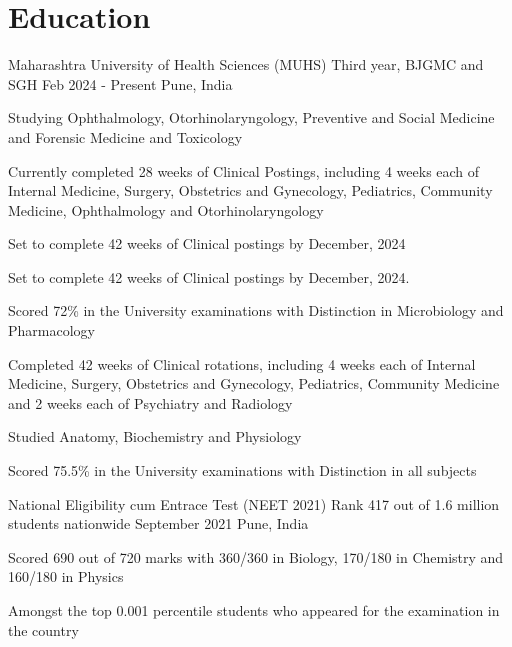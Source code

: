 \section{Education}
\resumeSubHeadingListStart

\resumeExp
{Maharashtra University of Health Sciences (MUHS)}
{Third year, BJGMC and SGH}
{Feb 2024 - Present}
{Pune, India}

\resumeItemListStart
\item[$\bullet$] Studying Ophthalmology, Otorhinolaryngology, Preventive and Social Medicine and Forensic Medicine and Toxicology
\item[$\bullet$] Currently completed 28 weeks of Clinical Postings, including 4 weeks each of Internal Medicine, Surgery, Obstetrics and Gynecology, Pediatrics, Community Medicine, Ophthalmology and Otorhinolaryngology
\item[$\bullet$] Set to complete 42 weeks of Clinical postings by December, 2024
\resumeItemListEnd


\resumeItemListStart
\item[$\bullet$] Set to complete 42 weeks of Clinical postings by December, 2024.
\item[$\bullet$] Scored 72\% in the University examinations with Distinction in Microbiology and Pharmacology
\item[$\bullet$] Completed 42 weeks of Clinical rotations, including 4 weeks each of Internal Medicine, Surgery, Obstetrics and Gynecology, Pediatrics, Community Medicine  and 2 weeks each of Psychiatry and Radiology
\resumeItemListEnd


\resumeItemListStart
\item[$\bullet$] Studied Anatomy, Biochemistry and Physiology
\item[$\bullet$] Scored 75.5\% in the University examinations with Distinction in all subjects
\resumeItemListEnd

\resumeExp
{National Eligibility cum Entrace Test (NEET 2021)}
{Rank 417 out of 1.6 million students nationwide}
{September 2021}
{Pune, India}

\resumeItemListStart
		\item[$\bullet$] Scored 690 out of 720 marks with 360/360 in Biology, 170/180 in Chemistry and 160/180 in Physics
        \item[$\bullet$] Amongst the top 0.001 percentile students who appeared for the examination in the country
\resumeItemListEnd

